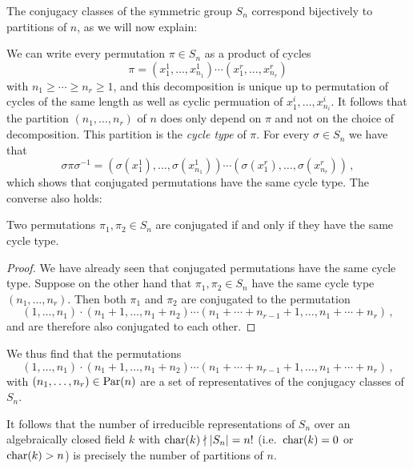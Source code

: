 

\begin{example}
  \label{example: conjugacy classes of symmetric group}
  The conjugacy classes of the symmetric group $S_n$ correspond bijectively to partitions of $n$, as we will now explain:
  
  We can write every permutation $\pi \in S_n$ as a product of cycles
  \[
      \pi
    = \left( x^1_1, \dotsc, x^1_{n_1} \right)
      \dotsm
      \left( x^r_1, \dotsc, x^r_{n_r} \right)
  \]
  with $n_1 \geq \dotsb \geq n_r \geq 1$, and this decomposition is unique up to permutation of cycles of the same length as well as cyclic permuation of $x^i_1, \dotsc, x^i_{n_i}$.
  It follows that the partition $(n_1, \dotsc, n_r)$ of $n$ does only depend on $\pi$ and not on the choice of decomposition.
  This partition is the \emph{cycle type} of $\pi$.
  For every $\sigma \in S_n$ we have that
  \[
      \sigma \pi \sigma^{-1}
    = \left( \sigma(x^1_1), \dotsc, \sigma(x^1_{n_1}) \right)
      \dotsm
      \left( \sigma(x^r_1), \dotsc, \sigma(x^r_{n_r}) \right) \,,
  \]
  which shows that conjugated permutations have the same cycle type.
  The converse also holds:
  
  \begin{claim}
    Two permutations $\pi_1, \pi_2 \in S_n$ are conjugated if and only if they have the same cycle type.
  \end{claim}
  
  \begin{proof}
    We have already seen that conjugated permutations have the same cycle type.
    Suppose on the other hand that $\pi_1, \pi_2 \in S_n$ have the same cycle type $(n_1, \dotsc, n_r)$.
    Then both $\pi_1$ and $\pi_2$ are conjugated to the permutation
    \[
              (1, \dotsc, n_1)
      \cdot   (n_1 + 1, \dotsc, n_1 + n_2)
      \dotsm  (n_1 + \dotsb + n_{r-1} + 1, \dotsc, n_1 + \dotsb + n_r) \,,
    \]
    and are therefore also conjugated to each other.
  \end{proof}
  We thus find that the permutations
  \[
            (1, \dotsc, n_1)
    \cdot   (n_1 + 1, \dotsc, n_1 + n_2)
    \dotsm  (n_1 + \dotsb + n_{r-1} + 1, \dotsc, n_1 + \dotsb + n_r) \,,
  \]
  with $(n_1, \dotsc, n_r) \in \operatorname{Par}(n)$ are a set of representatives of the conjugacy classes of $S_n$.
  
  It follows that the number of irreducible representations of $S_n$ over an algebraically closed field $k$ with $\operatorname{char}(k) \nmid |S_n| = n!$ (i.e.\ $\operatorname{char}(k) = 0$ or $\operatorname{char}(k) > n$) is precisely the number of partitions of $n$.
\end{example}



